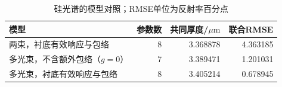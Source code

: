 \begin{table}[htbp]
\centering
\small
\caption{硅光谱的模型对照；RMSE单位为反射率百分点}
\label{tab:silicon-models}
\begin{tabular}{lrrr}
\toprule
模型 & 参数数 & 共同厚度/$\mu\mathrm m$ & 联合RMSE\\
\midrule
两束，衬底有效响应与包络 & 8 & 3.368878 & 4.363185\\
多光束，不含额外包络（$g=0$） & 7 & 3.389471 & 1.201031\\
多光束，衬底有效响应与包络 & 8 & 3.405214 & 0.678945\\
\bottomrule
\end{tabular}
\end{table}
